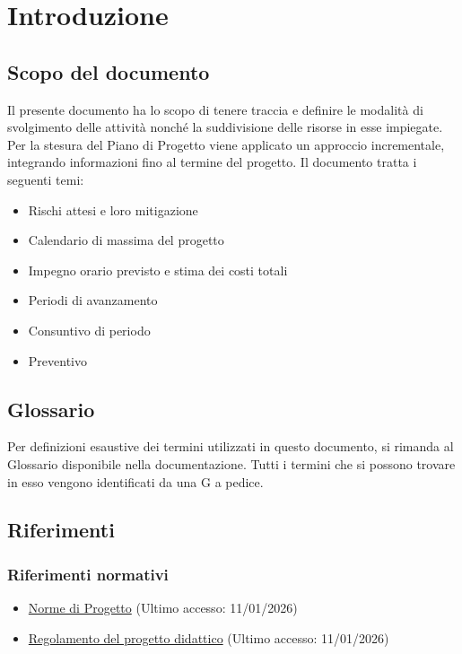 \documentclass[a4paper,12pt]{article}
\begin{document}
\newpage

\section{Introduzione}
    \subsection{Scopo del documento}
        Il presente documento ha lo scopo di tenere traccia e definire le modalità di svolgimento delle attività nonché la suddivisione delle risorse in esse impiegate.
        Per la stesura del Piano di Progetto viene applicato un approccio incrementale, integrando informazioni fino al termine del progetto. Il documento tratta i seguenti temi:
        \begin{itemize}
            \item Rischi attesi e loro mitigazione
            \item Calendario di massima del progetto
            \item Impegno orario previsto e stima dei costi totali
            \item Periodi di avanzamento
            \item Consuntivo di periodo
            \item Preventivo
        \end{itemize}
    \subsection{Glossario}
        Per definizioni esaustive dei termini utilizzati in questo documento, si rimanda al Glossario disponibile nella documentazione. Tutti i termini che si possono trovare in esso vengono identificati da una G a pedice.
    \subsection{Riferimenti}
        \subsubsection{Riferimenti normativi}
            \begin{itemize}
                \item \href{https://team-three-technologies.github.io/Documenti/1%20-%20RTB/Norme_di_progetto_v0_4.pdf}{Norme di Progetto} (Ultimo accesso: 11/01/2026)
                \item \href{https://www.math.unipd.it/~tullio/IS-1/2025/Dispense/PD1.pdf}{Regolamento del progetto didattico} (Ultimo accesso: 11/01/2026)
            \end{itemize}
\end{document}
